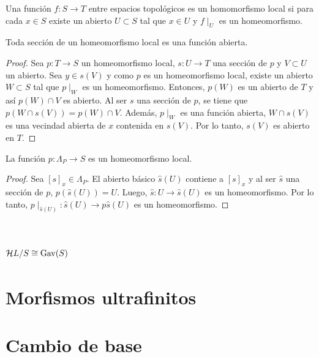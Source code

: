 \begin{definition}
Una función $f\colon S\to T$ entre espacios topológicos es un homomorfismo local si para cada $x\in S$ existe un abierto $U\subset S$ tal que $x\in U$ y $f\mid_U$ es un homeomorfismo.
\end{definition}

\begin{lema}
Toda sección de un homeomorfismo local es una función abierta.
\end{lema}

\begin{proof}
Sea $p\colon T\to S$ un homeomorfismo local, $s\colon U\to T$ una sección de $p$ y $V\subset U$ un abierto. Sea $y\in s(V)$ y como $p$ es un homeomorfismo local, existe un abierto $W\subset S$ tal que $p\mid_W$ es un homeomorfismo. Entonces, $p(W)$ es un abierto de $T$ y así $p(W)\cap V$ es abierto. Al ser $s$ una sección de $p$, se tiene que $p(W\cap s(V))=p(W)\cap V$. Además, $p\mid_W$ es una función abierta, $W\cap s(V)$ es una vecindad abierta de $x$ contenida en $s(V)$. Por lo tanto, $s(V)$ es abierto en $T$.
\end{proof}

\begin{lema}
La función $p\colon \Lambda_P\to S$ es un homeomorfismo local.
\end{lema}

\begin{proof}
Sea $[s]_x\in \Lambda_P$. El abierto básico $\hat{s}(U)$ contiene a $[s]_x$ y al ser $\hat{s}$ una sección de $p$, $p(\hat{s}(U))=U$. Luego, $\hat{s}\colon U\to \hat{s}(U)$ es un homeomorfismo. Por lo tanto, $p\mid_{\hat{s}(U)}\colon \hat{s}(U)\to p\hat{s}(U)$ es un homeomorfismo.
\end{proof}

\section{${\mathcal H} L/S\cong {\mathrm{Gav}}(S)$}

\section{Morfismos ultrafinitos}

\section{Cambio de base}